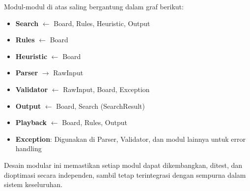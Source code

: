Modul-modul di atas saling bergantung dalam graf berikut:

\begin{itemize}
    \item \textbf{Search} \(\leftarrow\) Board, Rules, Heuristic, Output
    \item \textbf{Rules} \(\leftarrow\) Board
    \item \textbf{Heuristic} \(\leftarrow\) Board
    \item \textbf{Parser} \(\rightarrow\) RawInput
    \item \textbf{Validator} \(\leftarrow\) RawInput, Board, Exception
    \item \textbf{Output} \(\leftarrow\) Board, Search (SearchResult)
    \item \textbf{Playback} \(\leftarrow\) Board, Rules, Output
    \item \textbf{Exception}: Digunakan di Parser, Validator, dan modul lainnya untuk error handling
\end{itemize}

Desain modular ini memastikan setiap modul dapat dikembangkan, ditest, dan dioptimasi secara independen, sambil tetap terintegrasi dengan sempurna dalam sistem keseluruhan.
